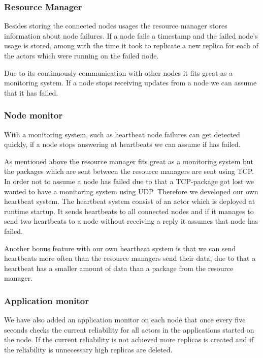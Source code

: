 \documentclass{cslthse-msc}
\begin{document}
\subsubsection{Resource Manager}
Besides storing the connected nodes usages the resource manager stores information about node failures. If a node fails a timestamp and the failed node's usage is stored, among with the time it took to replicate a new replica for each of the actors which were running on the failed node.

Due to its continuously communication with other nodes it fits great as a monitoring system. If a node stops receiving updates from a node we can assume that it has failed.

\subsubsection{Node monitor} %
With a monitoring system, such as heartbeat node failures can get detected quickly, if a node stops answering at heartbeats we can assume if has failed.

As mentioned above the resource manager fits great as a monitoring system but the packages which are sent between the resource managers are sent using TCP. In order not to assume a node has failed due to that a TCP-package got lost we wanted to have a monitoring system using UDP. Therefore we developed our own heartbeat system. The heartbeat system consist of an actor which is deployed at runtime startup. It sends heartbeats to all connected nodes and if it manages to send two heartbeats to a node without receiving a reply it assumes that node has failed. 

Another bonus feature with our own heartbeat system is that we can send heartbeats more often than the resource managers send their data, due to that a heartbeat has a smaller amount of data than a package from the resource manager.

\subsubsection{Application monitor}
We have also added an application monitor on each node that once every five seconds checks the current reliability for all actors in the applications started on the node. %
If the current reliability is not achieved more replicas is created and if the reliability is unnecessary high replicas are deleted.
\end{document}
